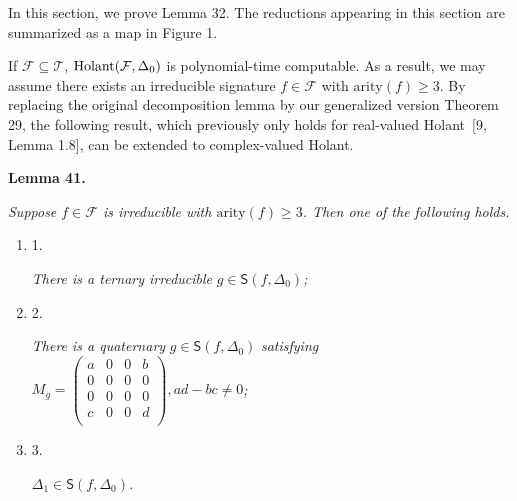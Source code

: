 \documentclass[10pt,a4paper]{article}
\begin{document}
In this section, we prove Lemma 32. The reductions appearing in this section are summarized as a map in Figure 1.\par




If $\mathcal{F}\subseteq\mathcal{T}$, $\textup{{Holant}}(\mathcal{F},\Delta_{0})$ is polynomial-time computable. As a result, we may assume there exists an irreducible signature $f\in\mathcal{F}$ with $\text{arity}(f)\geq 3$. By replacing the original decomposition lemma by our generalized version Theorem 29, the following result, which previously only holds for real-valued Holant [9, Lemma 1.8], can be extended to complex-valued Holant.\par





\par\medskip\noindent\textbf{
\textbf{Lemma 41}\textbf{.}
}\par



\emph{Suppose $f\in\mathcal{F}$ is irreducible with $\text{arity}(f)\geq 3$. Then one of the following holds.}\par


\begin{enumerate}


\item[] 
1. 


\emph{There is a ternary irreducible }$g\in\textsf{S}(f,\Delta_{0})$\emph{;}\par





\item[] 
2. 


\emph{There is a quaternary }$g\in\textsf{S}(f,\Delta_{0})$\emph{ satisfying }$M_{g}=\begin{pmatrix}a&0&0&b\\
0&0&0&0\\
0&0&0&0\\
c&0&0&d\\
\end{pmatrix},ad-bc\neq 0$\emph{;}\par





\item[] 
3. 


$\Delta_{1}\in\textsf{S}(f,\Delta_{0})$\emph{.}\par





\end{enumerate}
\end{document}
